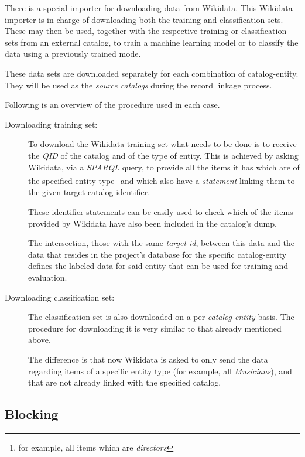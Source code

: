 \documentclass[epsfig,a4paper,11pt,titlepage,twoside,openany]{book}
\begin{document}
There is a special importer for downloading data from Wikidata. This Wikidata importer is in charge of downloading both the training and classification sets. These may then be used, together with the respective training or classification sets from an external catalog, to train a machine learning model or to classify the data using a previously trained mode.

These data sets are downloaded separately for each combination of catalog-entity. They will be used as the \textit{source catalogs} during the record linkage process.

Following is an overview of the procedure used in each case. 

\begin{description}
\item[Downloading training set:] 

To download the Wikidata training set what needs to be done is to receive the \textit{QID} of the catalog and of the type of entity. This is achieved by asking Wikidata, via a \textit{SPARQL} query, to provide all the items it has which are of the specified entity type\footnote{for example, all items which are \textit{directors}} and which also have a \textit{statement} linking them to the given target catalog identifier. 

These identifier statements can be easily used to check which of the items provided by Wikidata have also been included in the catalog's dump. 

The intersection, those with the same \textit{target id}, between this data and the data that resides in the project’s database for the specific catalog-entity defines the labeled data  for said entity that can be used for training and evaluation.
 
 
\item[Downloading classification set:] The classification set is also downloaded on a per \textit{catalog-entity} basis. The procedure for downloading it is very similar to that already mentioned above. 

The difference is that now Wikidata is asked to only send  the data regarding items of a specific entity type (for example, all \textit{Musicians}), and that are not already linked with the specified catalog.
\end{description}



\subsection{Blocking}
\label{sec:soweego-st-blocking}
\end{document}
